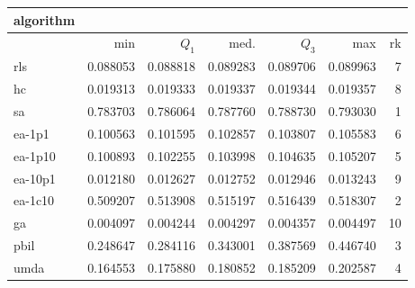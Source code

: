 \begin{tabular}{@{}l*{5}{>{{}}N{1}{3}}>{{}}N{2}{0}@{}}
\toprule
{algorithm} &  \\
\midrule
& {min} & {$Q_1$} & {med.} & {$Q_3$} & {max} & {rk}\\
\midrule
rls & 0.088053 & 0.088818 & 0.089283 & 0.089706 & 0.089963 & 7\\
hc & 0.019313 & 0.019333 & 0.019337 & 0.019344 & 0.019357 & 8\\
sa & {\color{blue}} 0.783703 & {\color{blue}} 0.786064 & {\color{blue}} 0.787760 & {\color{blue}} 0.788730 & {\color{blue}} 0.793030 & 1\\
ea-1p1 & 0.100563 & 0.101595 & 0.102857 & 0.103807 & 0.105583 & 6\\
ea-1p10 & 0.100893 & 0.102255 & 0.103998 & 0.104635 & 0.105207 & 5\\
ea-10p1 & 0.012180 & 0.012627 & 0.012752 & 0.012946 & 0.013243 & 9\\
ea-1c10 & 0.509207 & 0.513908 & 0.515197 & 0.516439 & 0.518307 & 2\\
ga & 0.004097 & 0.004244 & 0.004297 & 0.004357 & 0.004497 & 10\\
pbil & 0.248647 & 0.284116 & 0.343001 & 0.387569 & 0.446740 & 3\\
umda & 0.164553 & 0.175880 & 0.180852 & 0.185209 & 0.202587 & 4\\
\bottomrule
\end{tabular}
